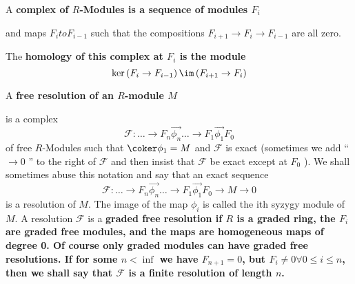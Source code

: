 \documentclass{article}
\begin{document}
% 



\begin{defn}

A \bf{complex} of \(R\)-Modules is a sequence of modules \( F_{i} \)


and maps \( F_{i} to F_{i-1} \) such that the compositions \( F_{i+1} \to F_{i} \to F_{i-1} \) are all zero.


The \bf{homology} of this complex at \( F_{i} \) is the module 
\[
	\ker \left( F_{i} \to F_{i-1} \right)   \/ \im \left( F_{i+1} \to F_{i} \right)
\]


A \bf{free resolution} of an \( R\)-module \( M \)


is a complex
\[
	\mathcal{F}: \hdots \to F_{n} \overset{\to}{\phi_{n}} 
	\hdots \to F_{1} \overset{\to}{\phi_{1}} F_{0}
\]
of free \(R\)-Modules such that \( \coker \phi_{1} = M \) 
and \( \mathcal{F} \)  is exact (sometimes we add `` \( \to 0 \) '' to the right of \(\mathcal{F}\) and then insist that \(\mathcal{F}\) be exact except at \( F_{0} \) ).
We shall sometimes abuse this notation and say that an exact sequence 
\[
	\mathcal{F}: \hdots \to F_{n} \overset{\to}{\phi_{n}} 
	\hdots \to F_{1} \overset{\to}{\phi_{1}} F_{0}
	\to M \to 0
\]
is a resolution of \( M \).  
The image of the map \( \phi_i \) is called the ith syzygy module of \(M \).
A resolution \( \mathcal{F }\) is a \bf{graded free resolution } if \( R \) is a graded ring, the \(  F_{i}\) are graded free modules, and the maps are homogeneous maps of degree 0.
Of course only graded modules can have graded free resolutions.
If for some \( n < \inf \) we have \( F_{n+1}=0 \), 
but \( F_{i} \neq 0 \forall 0 \le i \le n \), then we shall say that 
\( \mathcal{F}\) is a \bf{finite resolution of length} \( n\).
\end{defn}
\end{document}
